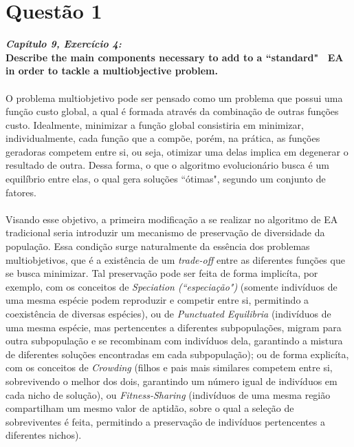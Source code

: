 \documentclass{report}
\begin{document}


\section*{Questão 1}

\textbf{\textit{Capítulo 9, Exercício 4:}}\\

\textbf{Describe the main components necessary to add to a ``standard" \ EA in order to tackle a multiobjective problem.}\\

\paragraph{} O problema multiobjetivo pode ser pensado como um problema que possui uma função custo global, a qual é formada através da combinação de outras funções custo. Idealmente, minimizar a função global consistiria em minimizar, individualmente, cada função que a compõe, porém, na prática, as funções geradoras competem entre si, ou seja, otimizar uma delas implica em degenerar o resultado de outra. Dessa forma, o que o algoritmo evolucionário busca é um equilíbrio entre elas, o qual gera soluções ``ótimas", segundo um conjunto de fatores.\\ 

\paragraph{} Visando esse objetivo, a primeira modificação a se realizar no algoritmo de EA tradicional seria introduzir um mecanismo de preservação de diversidade da população. Essa condição surge naturalmente da essência dos problemas multiobjetivos, que é a existência de um \textit{trade-off} entre as diferentes funções que se busca minimizar. Tal preservação pode ser feita de forma implicíta, por exemplo, com os conceitos de \textit{Speciation (``especiação")} (somente indivíduos de uma mesma espécie podem reproduzir e competir entre si, permitindo a coexistência de diversas espécies), ou de \textit{Punctuated Equilibria} (indivíduos de uma mesma espécie, mas pertencentes a diferentes subpopulações, migram para outra subpopulação e se recombinam com indivíduos dela, garantindo a mistura de diferentes soluções encontradas em cada subpopulação); ou de forma explicíta, com os conceitos de \textit{Crowding} (filhos e pais mais similares competem entre si, sobrevivendo o melhor dos dois, garantindo um número igual de indivíduos em cada nicho de solução), ou \textit{Fitness-Sharing} (indivíduos de uma mesma região compartilham um mesmo valor de aptidão, sobre o qual a seleção de sobreviventes é feita, permitindo a preservação de indivíduos pertencentes a diferentes nichos).\\
\end{document}
